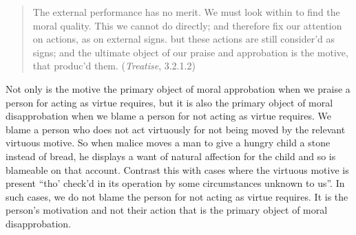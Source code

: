 \begin{quote}
    The external performance has no merit. We must look within to find the moral quality. This we cannot do directly; and therefore fix our attention on actions, as on external signs. but these actions are still consider'd as signs; and the ultimate object of our praise and approbation is the motive, that produc'd them. (\emph{Treatise}, 3.2.1.2)
\end{quote}

Not only is the motive the primary object of moral approbation when we praise a person for acting as virtue requires, but it is also the primary object of moral disapprobation when we blame a person for not acting as virtue requires. We blame a person who does not act virtuously for not being moved by the relevant virtuous motive. So when malice moves a man to give a hungry child a stone instead of bread, he displays a want of natural affection for the child and so is blameable on that account. Contrast this with cases where the virtuous motive is present ``tho' check'd in its operation by some circumstances unknown to us''. In such cases, we do not blame the person for not acting as virtue requires. It is the person's motivation and not their action that is the primary object of moral disapprobation.

